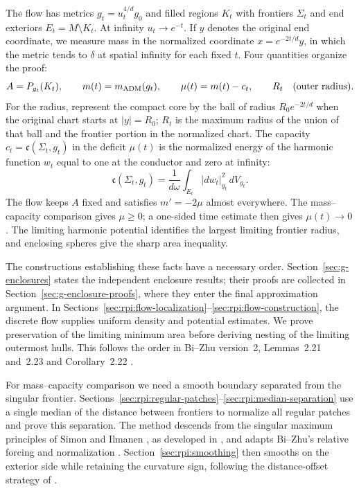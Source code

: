 The flow has metrics $g_t=u_t^{4/d}g_0$ and filled regions $K_t$ with
frontiers $\Sigma_t$ and end exteriors $E_t=M\setminus K_t$.
At infinity $u_t\to e^{-t}$. If $y$ denotes the original end coordinate,
we measure mass in the normalized coordinate $x=e^{-2t/d}y$,
in which the metric tends to $\delta$ at spatial infinity for each
fixed $t$.
Four quantities organize the proof:
\[
 A=P_{g_t}(K_t),\qquad m(t)=m_{\rm ADM}(g_t),\qquad
 \mu(t)=m(t)-c_t,\qquad R_t\quad\text{(outer radius)}.
\]
For the radius, represent the compact core by the ball of radius
$R_0e^{-2t/d}$ when the original chart starts at $|y|=R_0$; $R_t$ is
the maximum radius of the union of that ball and the frontier portion
in the normalized chart. The capacity
$c_t=\mathfrak c(\Sigma_t,g_t)$ in the deficit $\mu(t)$ is the
normalized energy of the harmonic function $w_t$
equal to one at the conductor and zero at infinity:
\[
 \mathfrak c(\Sigma_t,g_t)=\frac1{d\omega}
 \int_{E_t}|dw_t|_{g_t}^2\,dV_{g_t}.
\]
The flow keeps $A$ fixed and satisfies $m'=-2\mu$ almost everywhere.
The mass--capacity comparison gives $\mu\ge0$; a one-sided time estimate
then gives $\mu(t)\to0$. The limiting harmonic potential identifies
the largest limiting frontier radius, and enclosing
spheres give the sharp area inequality.

The constructions establishing these facts have a necessary order.
Section~\ref{sec:g-enclosures} states the independent enclosure results;
their proofs are collected in Section~\ref{sec:g-enclosure-proofs},
where they enter the final approximation argument. In
Sections~\ref{sec:rpi:flow-localization}--\ref{sec:rpi:flow-construction},
the discrete flow supplies uniform density and potential estimates.
We prove preservation of the limiting minimum area before deriving
nesting of the limiting outermost hulls. This follows the order in
Bi--Zhu version~2, Lemmas~2.21 and~2.23 and Corollary~2.22
\cite{BiZhu2026v2}.

For mass--capacity comparison we need a smooth boundary separated from
the singular frontier. Sections~\ref{sec:rpi:regular-patches}--\ref{sec:rpi:median-separation}
use a single median of the distance between frontiers to normalize all
regular patches and prove this separation. The method descends from the
singular maximum principles of Simon and Ilmanen
\cite{Simon1987Maximum,Ilmanen1996Maximum}, as developed in
\cite[Section~4]{Wickramasekera2014Maximum}, and adapts Bi--Zhu's relative
forcing and normalization \cite[Proposition~2.34 and Lemma~2.35]{BiZhu2026v2}.
Section~\ref{sec:rpi:smoothing} then smooths on the exterior side while
retaining the curvature sign, following the distance-offset strategy
of \cite{BiZhuSmoothing2026}.

